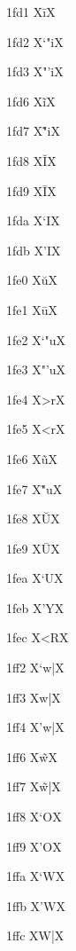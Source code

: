 \documentclass[11pt]{article}
\begin{document}
1fd1 X{\textgreek{\={i}}}X

1fd2 X{\textgreek{`"i}}X

1fd3 X{\textgreek{"'i}}X

1fd6 X{\textgreek{\~{i}}}X

1fd7 X{\textgreek{\~{"i}}}X

1fd8 X{\textgreek{\u{I}}}X

1fd9 X{\textgreek{\={I}}}X

1fda X{\textgreek{`I}}X

1fdb X{\textgreek{'I}}X

1fe0 X{\textgreek{\u{u}}}X

1fe1 X{\textgreek{\={u}}}X

1fe2 X{\textgreek{`"u}}X

1fe3 X{\textgreek{"'u}}X

1fe4 X{\textgreek{>r}}X

1fe5 X{\textgreek{<r}}X

1fe6 X{\textgreek{\~{u}}}X

1fe7 X{\textgreek{\~{"u}}}X

1fe8 X{\textgreek{\u{U}}}X

1fe9 X{\textgreek{\={U}}}X

1fea X{\textgreek{`U}}X

1feb X{\textgreek{'Y}}X

1fec X{\textgreek{<R}}X

1ff2 X{\textgreek{`w|}}X

1ff3 X{\textgreek{w|}}X

1ff4 X{\textgreek{'w|}}X

1ff6 X{\textgreek{\~{w}}}X

1ff7 X{\textgreek{\~{w}|}}X

1ff8 X{\textgreek{`O}}X

1ff9 X{\textgreek{'O}}X

1ffa X{\textgreek{`W}}X

1ffb X{\textgreek{'W}}X

1ffc X{\textgreek{W|}}X
\end{document}
